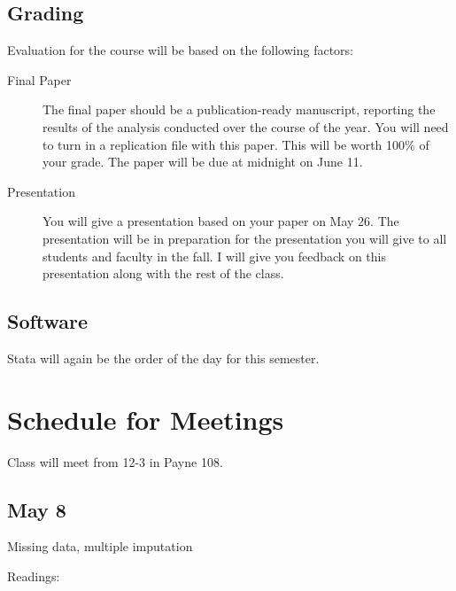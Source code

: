 \documentclass[10pt]{article}
\begin{document}
\subsection{Grading}%
\begin{flushleft}
Evaluation for the course will be based on the following factors:

\begin{description}
\item[Final Paper] The final paper should be a publication-ready
  manuscript, reporting the results of the analysis conducted over the
  course of the year. You will need to turn in a replication file with
  this paper. This will be worth 100\% of your grade. The paper will
  be due at midnight on June 11. 


\item[Presentation] You will give a presentation based on your paper
  on May 26.  The presentation will be in preparation for the
  presentation you will give to all students and faculty in the
  fall. I will give you feedback on this presentation along with the
  rest of the class. 

\end{description}


\end{flushleft}
\subsection{Software}

Stata will again be the order of the day for this semester. 

\section{Schedule for Meetings}

Class will meet from 12-3 in Payne 108.  


\subsection{May 8}

Missing data, multiple imputation

Readings:

\begin{description}

\item {}

\item {}

\item {}
  
\end{description}
\end{document}
